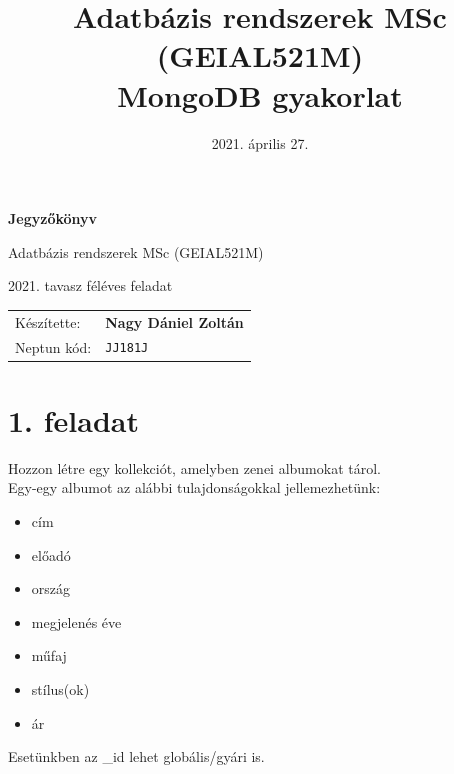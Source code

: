 \documentclass[a4paper, 12pt]{article}
\title{\vskip -30pt Adatbázis rendszerek MSc (GEIAL521M)\\\LARGE{\textbf{MongoDB gyakorlat}}}
\date{\vskip -30pt 2021. április 27.}
\author{}
\begin{document}
\begin{titlepage}

\begin{center}


{\Huge \textbf{\vskip 200pt Jegyzőkönyv}}

\bigskip

{\LARGE Adatbázis rendszerek MSc (GEIAL521M)}

\medskip

{\LARGE 2021. tavasz féléves feladat}

\end{center}

\vskip 350pt

\null\hfill{
\large
\begin{tabular}{ l l }
 Készítette: & \textbf{Nagy Dániel Zoltán} \\ 
 Neptun kód: & \texttt{JJ181J}  
\end{tabular}
}

\end{titlepage}


\maketitle

\section*{1. feladat}
Hozzon létre egy kollekciót, amelyben zenei albumokat tárol.\\
Egy-egy albumot az alábbi tulajdonságokkal jellemezhetünk:
\begin{itemize}[noitemsep]
	\item cím
	\item előadó
	\item ország
	\item megjelenés éve
	\item műfaj
	\item stílus(ok)
	\item ár
\end{itemize}
Esetünkben az \_id lehet globális/gyári is.
\end{document}
